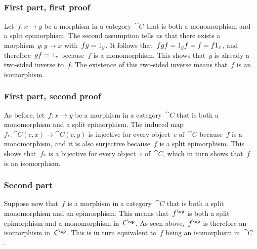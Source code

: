 \subsection{}



\subsubsection*{First part, first proof}

Let~$f \colon x \to y$ be a morphism in a category~$\cat{C}$ that is both a monomorphism and a split epimorphism.
The second assumption tells us that there exists a morphism~$g \colon y \to x$ with~$f g = 1_y$.
It follows that~$f g f = 1_y f = f = f 1_x$, and therefore~$g f = 1_x$ because~$f$ is a monomorphism.
This shows that~$g$ is already a two-sided inverse to~$f$.
The existence of this two-sided inverse means that~$f$ is an isomorphism.



\subsubsection*{First part, second proof}

As before, let~$f \colon x \to y$ be a morphism in a category~$\cat{C}$ that is both a monomorphism and a split epimorphism.
The induced map~$f_* \colon \cat{C}(c, x) \to \cat{C}(c, y)$ is injective for every object~$c$ of~$\cat{C}$ because~$f$ is a monomorphism, and it is also surjective because~$f$ is a split epimorphism.
This shows that~$f_*$ is a bijective for every object~$c$ of~$\cat{C}$, which in turn shows that~$f$ is an isomorphism.



\subsubsection*{Second part}

Suppose now that~$f$ is a morphism in a category~$\cat{C}$ that is both a split monomorphism and an epimorphism.
This means that~$f^{\op}$ is both a split epimorphism and a monomorphism in~$\cat{C}^{\op}$.
As seen above,~$f^{\op}$ is therefore an isomorphism in~$\cat{C}^{\op}$.
This is in turn equivalent to~$f$ being an isomorphism in~$\cat{C}$.
